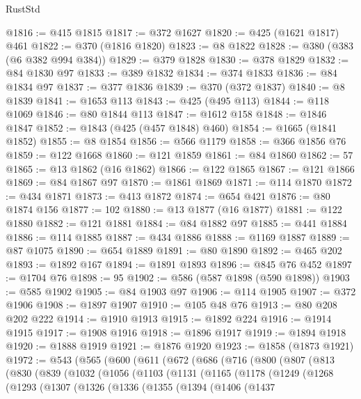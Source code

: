 \begin{lexlean}{RustStd}
\begin{coremodule}
{\begin{coremodule}
{{{{{{{{{{{{{{{{{{{{{{{{{{{{{{{{{{{{{{{{{{{{{{{{{{{{{{@1816 := @415 @1815
@1817 := @372 @1627
@1820 := @425 (@1621 @1817) @461
@1822 := @370 (@1816 @1820)
@1823 := @8 @1822
@1828 := @380 (@383 (@6 @382 @994 @384))
@1829 := @379 @1828
@1830 := @378 @1829
@1832 := @84 @1830 @97
@1833 := @389 @1832
@1834 := @374 @1833
@1836 := @84 @1834 @97
@1837 := @377 @1836
@1839 := @370 (@372 @1837)
@1840 := @8 @1839
@1841 := @1653 @113
@1843 := @425 (@495 @113)
@1844 := @118 @1069
@1846 := @80 @1844 @113
@1847 := @1612 @158
@1848 := @1846 @1847
@1852 := @1843 (@425 (@457 @1848) @460)
@1854 := @1665 (@1841 @1852)
@1855 := @8 @1854
@1856 := @566 @1179
@1858 := @366 @1856 @76
@1859 := @122 @1668
@1860 := @121 @1859
@1861 := @84 @1860
@1862 := 57
@1865 := @13 @1862 (@16 @1862)
@1866 := @122 @1865
@1867 := @121 @1866
@1869 := @84 @1867 @97
@1870 := @1861 @1869
@1871 := @114 @1870
@1872 := @434 @1871
@1873 := @413 @1872
@1874 := @654 @421
@1876 := @80 @1874 @156
@1877 := 102
@1880 := @13 @1877 (@16 @1877)
@1881 := @122 @1880
@1882 := @121 @1881
@1884 := @84 @1882 @97
@1885 := @441 @1884
@1886 := @114 @1885
@1887 := @434 @1886
@1888 := @1169 @1887
@1889 := @87 @1075
@1890 := @654 @1889
@1891 := @80 @1890
@1892 := @465 @202
@1893 := @1892 @167
@1894 := @1891 @1893
@1896 := @845 @76 @452
@1897 := @1704 @76
@1898 := 95
@1902 := @586 (@587 @1898 (@590 @1898))
@1903 := @585 @1902
@1905 := @84 @1903 @97
@1906 := @114 @1905
@1907 := @372 @1906
@1908 := @1897 @1907
@1910 := @105 @48 @76
@1913 := @80 @208 @202 @222
@1914 := @1910 @1913
@1915 := @1892 @224
@1916 := @1914 @1915
@1917 := @1908 @1916
@1918 := @1896 @1917
@1919 := @1894 @1918
@1920 := @1888 @1919
@1921 := @1876 @1920
@1923 := @1858 (@1873 @1921)
@1972 := @543
    (@565
      (@600
        (@611
          (@672
            (@686
              (@716
                (@800
                  (@807
                    (@813
                      (@830
                        (@839
                          (@1032
                            (@1056
                              (@1103
                                (@1131
                                  (@1165
                                    (@1178
                                      (@1249
                                        (@1268
                                          (@1293
                                            (@1307
                                              (@1326
                                                (@1336
                                                  (@1355
                                                    (@1394
                                                      (@1406
                                                        (@1437
}}}}}}}}}}}}}}}}}}}}}}}}}}}}}}}}}}}}}}}}}}}}}}}}}}}}}}
\end{coremodule}}
\end{coremodule}
\end{lexlean}
